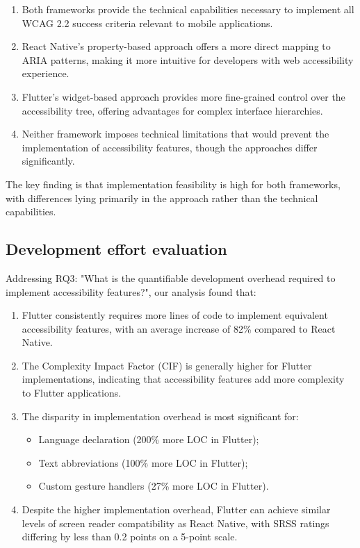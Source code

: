 \begin{enumerate}
    \item Both frameworks provide the technical capabilities necessary to implement all WCAG 2.2 success criteria relevant to mobile applications.
    
    \item React Native's property-based approach offers a more direct mapping to ARIA patterns, making it more intuitive for developers with web accessibility experience.
    
    \item Flutter's widget-based approach provides more fine-grained control over the accessibility tree, offering advantages for complex interface hierarchies.
    
    \item Neither framework imposes technical limitations that would prevent the implementation of accessibility features, though the approaches differ significantly.
\end{enumerate}

The key finding is that implementation feasibility is high for both frameworks, with differences lying primarily in the approach rather than the technical capabilities.

\subsection{Development effort evaluation}
\label{subsec:development-effort}

Addressing RQ3: "What is the quantifiable development overhead required to implement accessibility features?", our analysis found that:

\begin{enumerate}
    \item Flutter consistently requires more lines of code to implement equivalent accessibility features, with an average increase of 82\% compared to React Native.
    
    \item The Complexity Impact Factor (CIF) is generally higher for Flutter implementations, indicating that accessibility features add more complexity to Flutter applications.
    
    \item The disparity in implementation overhead is most significant for:
    \begin{itemize}
        \item Language declaration (200\% more LOC in Flutter);
        \item Text abbreviations (100\% more LOC in Flutter);
        \item Custom gesture handlers (27\% more LOC in Flutter).
    \end{itemize}
    
    \item Despite the higher implementation overhead, Flutter can achieve similar levels of screen reader compatibility as React Native, with SRSS ratings differing by less than 0.2 points on a 5-point scale.
\end{enumerate}

